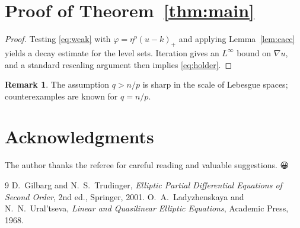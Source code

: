 \documentclass[11pt,reqno]{amsart}
\theoremstyle{definition}
\newtheorem{remark}[theorem]{Remark}
\begin{document}
\section{Proof of Theorem~\ref{thm:main}}\label{sec:proof}

\begin{proof}[Proof]
Testing \eqref{eq:weak} with $\varphi=\eta^p(u-k)_+$ and applying
Lemma~\ref{lem:cacc} yields a decay estimate for the level sets.
Iteration gives an $L^\infty$ bound on $\nabla u$, and a standard
rescaling argument then implies \eqref{eq:holder}.
\end{proof}

\begin{remark}
The assumption $q>n/p$ is sharp in the scale of Lebesgue spaces;
counterexamples are known for $q=n/p$.
\end{remark}

\section*{Acknowledgments}
The author thanks the referee for careful reading and valuable suggestions.
😀
\begin{thebibliography}{9}
 D.~Gilbarg and N.~S.~Trudinger, \emph{Elliptic Partial Differential
  Equations of Second Order}, 2nd ed., Springer, 2001.
 O.~A.~Ladyzhenskaya and N.~N.~Ural'tseva, \emph{Linear and Quasilinear
  Elliptic Equations}, Academic Press, 1968.
\end{thebibliography}
\end{document}
